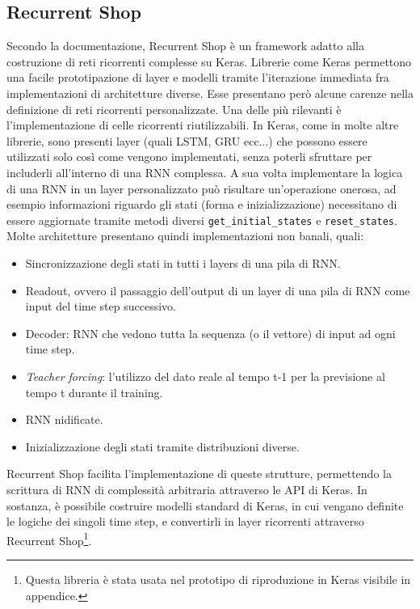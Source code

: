 \subsection{Recurrent Shop}
Secondo la documentazione\cite{recurrentshop}, Recurrent Shop è un framework adatto alla costruzione di reti ricorrenti complesse su Keras. Librerie come Keras permettono una facile prototipazione di layer e modelli tramite l'iterazione immediata fra implementazioni di architetture diverse. Esse presentano però alcune carenze nella definizione di reti ricorrenti personalizzate. Una delle più rilevanti è l'implementazione di celle ricorrenti riutilizzabili. In Keras, come in molte altre librerie, sono presenti layer (quali LSTM, GRU ecc...) che possono essere utilizzati solo così come vengono implementati, senza poterli sfruttare per includerli all'interno di una RNN complessa. A sua volta implementare la logica di una RNN in un layer personalizzato può risultare un'operazione onerosa, ad esempio informazioni riguardo gli stati (forma e inizializzazione) necessitano di essere aggiornate tramite metodi diversi \lstinline{get_initial_states} e \lstinline{reset_states}. Molte architetture presentano quindi implementazioni non banali, quali:
\begin{itemize}
	\item Sincronizzazione degli stati in tutti i layers di una pila di RNN.
	\item Readout, ovvero il passaggio dell'output di un layer di una pila di RNN come input del time step successivo.
	\item Decoder: RNN che vedono tutta la sequenza (o il vettore) di input ad ogni time step.
	\item \textit{Teacher forcing}: l'utilizzo del dato reale al tempo t-1 per la previsione al tempo t durante il training.
	\item RNN nidificate.
	\item Inizializzazione degli stati tramite distribuzioni diverse.
\end{itemize}

Recurrent Shop facilita l'implementazione di queste strutture, permettendo la scrittura di RNN di complessità arbitraria attraverso le API di Keras. In sostanza, è possibile costruire modelli standard di Keras, in cui vengano definite le logiche dei singoli time step, e convertirli in layer ricorrenti attraverso Recurrent Shop\footnote{Questa libreria è stata usata nel prototipo di riproduzione in Keras visibile in appendice.}.
